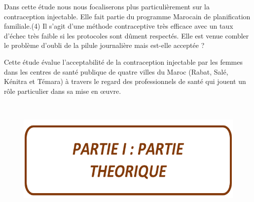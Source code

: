 \noindent Dans cette étude  nous nous focaliserons plus particulièrement sur la contraception injectable. 
Elle fait partie du programme Marocain de planification familiale.(4) Il s’agit d’une méthode contraceptive très efficace avec un taux d’échec très faible si les protocoles sont dûment respectés. Elle est venue combler le problème d’oubli de la pilule journalière  mais est-elle acceptée ? \vspace*{1em}

\noindent Cette étude évalue l’acceptabilité de la contraception injectable par les femmes dans les centres de santé publique de quatre villes du Maroc (Rabat, Salé, Kénitra et Témara) à travers le regard des professionnels de santé qui jouent un rôle particulier dans sa mise en œuvre.\vspace*{1em}

\pagebreak

\begin{itemize}
  \item[\textcolor{white}{$\Box$}] 
\end{itemize}


\vspace{7cm}

\begin{figure}[H]
  \includegraphics{Images/partie_theorique.png}
\end{figure}


\section*{}

\pagebreak


